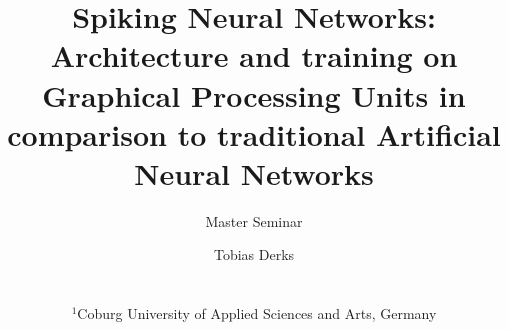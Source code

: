 \documentclass{download/egPublStyle-cgf/egpubl}
\author[Master Seminar]{\parbox{\textwidth}{\centering Master Seminar}}
\author[Derks]
    {\parbox{\textwidth}{\centering 
            Tobias Derks     		      		                
            }
            \\
            {
                \parbox{\textwidth}
                {
                    \centering $^1$Coburg University of Applied Sciences and Arts, Germany
                }
            }
    }
\title[SNNs on GPUs]{Spiking Neural Networks: Architecture and
training on Graphical Processing Units in comparison to traditional Artificial Neural Networks}
\begin{document}
\teaser
{
     
}
\maketitle
\begin{abstract}


\end{abstract}

 


\end{document}
